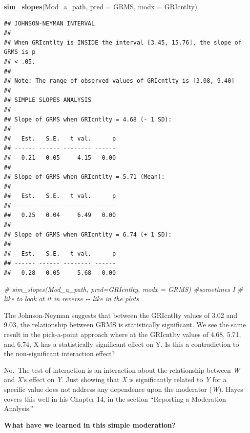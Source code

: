 \documentclass[
  11pt,
]{book}
\newenvironment{Shaded}{\begin{snugshade}}{\end{snugshade}}
\newcommand{\AttributeTok}[1]{\textcolor[rgb]{0.27,0.27,0.27}{#1}}
\newcommand{\CommentTok}[1]{\textcolor[rgb]{0.37,0.37,0.37}{\textit{#1}}}
\newcommand{\FunctionTok}[1]{\textcolor[rgb]{0.27,0.27,0.27}{\textbf{#1}}}
\newcommand{\NormalTok}[1]{#1}
\begin{document}
\begin{Shaded}
\begin{Highlighting}[]
\FunctionTok{sim\_slopes}\NormalTok{(Mod\_a\_path, }\AttributeTok{pred =}\NormalTok{ GRMS, }\AttributeTok{modx =}\NormalTok{ GRIcntlty)}
\end{Highlighting}
\end{Shaded}

\begin{verbatim}
## JOHNSON-NEYMAN INTERVAL 
## 
## When GRIcntlty is INSIDE the interval [3.45, 15.76], the slope of GRMS is p
## < .05.
## 
## Note: The range of observed values of GRIcntlty is [3.08, 9.40]
## 
## SIMPLE SLOPES ANALYSIS 
## 
## Slope of GRMS when GRIcntlty = 4.68 (- 1 SD): 
## 
##   Est.   S.E.   t val.      p
## ------ ------ -------- ------
##   0.21   0.05     4.15   0.00
## 
## Slope of GRMS when GRIcntlty = 5.71 (Mean): 
## 
##   Est.   S.E.   t val.      p
## ------ ------ -------- ------
##   0.25   0.04     6.49   0.00
## 
## Slope of GRMS when GRIcntlty = 6.74 (+ 1 SD): 
## 
##   Est.   S.E.   t val.      p
## ------ ------ -------- ------
##   0.28   0.05     5.68   0.00
\end{verbatim}

\begin{Shaded}
\begin{Highlighting}[]
\CommentTok{\# sim\_slopes(Mod\_a\_path, pred=GRIcntlty, modx = GRMS) \#sometimes I}
\CommentTok{\# like to look at it in reverse {-}{-} like in the plots}
\end{Highlighting}
\end{Shaded}

The Johnson-Neyman suggests that between the GRIcntlty values of 3.02 and 9.03, the relationship between GRMS is statistically significant. We see the same result in the pick-a-point approach where at the GRIcntlty values of 4.68, 5.71, and 6.74, X has a statistically significant effect on Y. Is this a contradiction to the non-significant interaction effect?

No.~The test of interaction is an interaction about the relationship between \emph{W} and \emph{X}'s effect on \emph{Y}. Just showing that \emph{X} is significantly related to \emph{Y} for a specific value does not address any dependence upon the moderator (\emph{W}). Hayes \citeyearpar{hayes_introduction_2018} covers this well in his Chapter 14, in the section ``Reporting a Moderation Analysis.''

\textbf{What have we learned in this simple moderation?}
\end{document}
